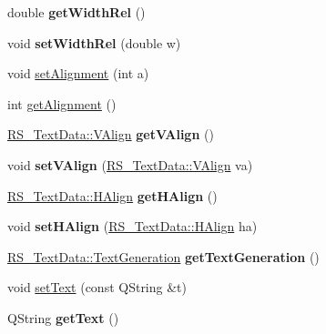 \begin{DoxyCompactItemize}
\item 
\hypertarget{classRS__Text_a6c13210ef4f03d5e44bfbd59689144eb}{double {\bfseries get\-Width\-Rel} ()}\label{classRS__Text_a6c13210ef4f03d5e44bfbd59689144eb}

\item 
\hypertarget{classRS__Text_a2bca728b9fcadf7a430d9741d0655a80}{void {\bfseries set\-Width\-Rel} (double w)}\label{classRS__Text_a2bca728b9fcadf7a430d9741d0655a80}

\item 
void \hyperlink{classRS__Text_a5e50d286d0abfa4f6ceee7993497238e}{set\-Alignment} (int a)
\item 
int \hyperlink{classRS__Text_a92b2f47dcc1e664d3f1c8a3cb18e2fa4}{get\-Alignment} ()
\item 
\hypertarget{classRS__Text_a2169384e5f2a8cf44bfd5169936a6cf9}{\hyperlink{classRS__TextData_ac2501fdff1871b36025d584099ab51d1}{R\-S\-\_\-\-Text\-Data\-::\-V\-Align} {\bfseries get\-V\-Align} ()}\label{classRS__Text_a2169384e5f2a8cf44bfd5169936a6cf9}

\item 
\hypertarget{classRS__Text_a02e82e2c1c2b9b50105a096425b051b2}{void {\bfseries set\-V\-Align} (\hyperlink{classRS__TextData_ac2501fdff1871b36025d584099ab51d1}{R\-S\-\_\-\-Text\-Data\-::\-V\-Align} va)}\label{classRS__Text_a02e82e2c1c2b9b50105a096425b051b2}

\item 
\hypertarget{classRS__Text_a0f04115dbb3935eb09a75f06dce89f4b}{\hyperlink{classRS__TextData_a70932aa9cb36e3b9cc11dc1029d3146d}{R\-S\-\_\-\-Text\-Data\-::\-H\-Align} {\bfseries get\-H\-Align} ()}\label{classRS__Text_a0f04115dbb3935eb09a75f06dce89f4b}

\item 
\hypertarget{classRS__Text_aad30bb4217199e7d0ac38059628f8071}{void {\bfseries set\-H\-Align} (\hyperlink{classRS__TextData_a70932aa9cb36e3b9cc11dc1029d3146d}{R\-S\-\_\-\-Text\-Data\-::\-H\-Align} ha)}\label{classRS__Text_aad30bb4217199e7d0ac38059628f8071}

\item 
\hypertarget{classRS__Text_aaf25b0b621522a9745083654e1e489cd}{\hyperlink{classRS__TextData_a1abf0a4dfba0000c09a599aa059f5fa0}{R\-S\-\_\-\-Text\-Data\-::\-Text\-Generation} {\bfseries get\-Text\-Generation} ()}\label{classRS__Text_aaf25b0b621522a9745083654e1e489cd}

\item 
void \hyperlink{classRS__Text_a36f69497be8b1d04abc5ee9c9a126bc6}{set\-Text} (const Q\-String \&t)
\item 
\hypertarget{classRS__Text_a71e011259a8fb98f346e074db8ecda23}{Q\-String {\bfseries get\-Text} ()}\label{classRS__Text_a71e011259a8fb98f346e074db8ecda23}


\end{DoxyCompactItemize}
